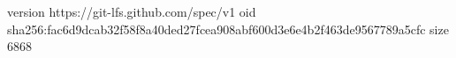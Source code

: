 version https://git-lfs.github.com/spec/v1
oid sha256:fac6d9dcab32f58f8a40ded27fcea908abf600d3e6e4b2f463de9567789a5cfc
size 6868
